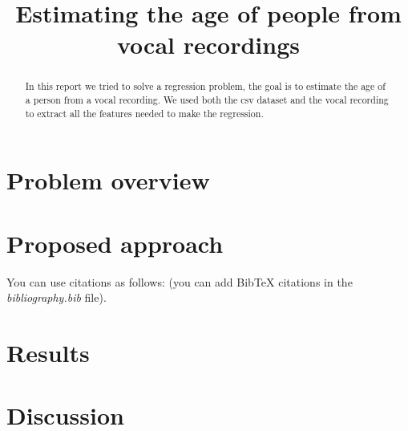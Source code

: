 \documentclass[conference]{IEEEtran}
\begin{document}
\title{Estimating the age of people from vocal recordings}

\author{
\and
{}
}

\maketitle

\begin{abstract}
In this report we tried to solve a regression problem, the goal is to estimate the age of a person from a vocal recording. We used both the csv dataset and the vocal recording to extract all the features needed to make the regression.
\end{abstract}

\section{Problem overview}


\section{Proposed approach}


You can use citations as follows: \cite{goodfellow2016deep} (you can add BibTeX citations in the \textit{bibliography.bib} file).


\section{Results}


\section{Discussion}





\end{document}
